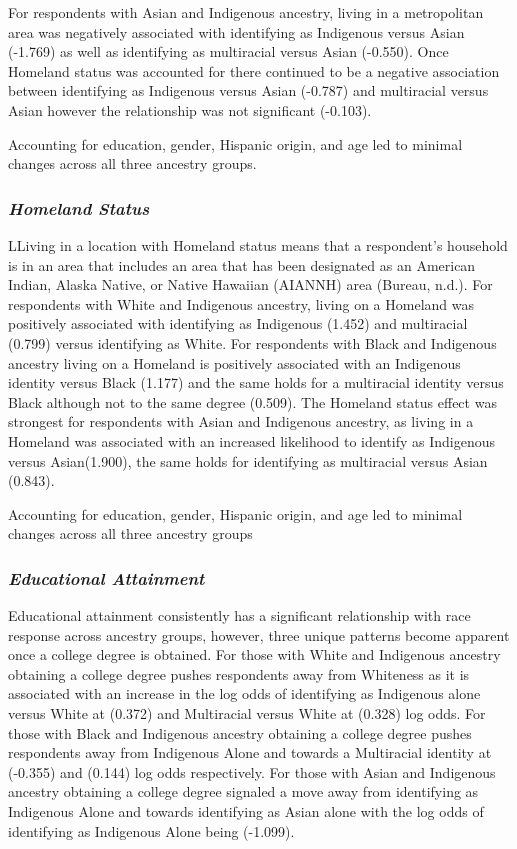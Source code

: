 \documentclass[
  12pt,
  letterpaper,
]{article}
\begin{document}
For respondents with Asian and Indigenous ancestry, living in a
metropolitan area was negatively associated with identifying as
Indigenous versus Asian (-1.769) as well as identifying as multiracial
versus Asian (-0.550). Once Homeland status was accounted for there
continued to be a negative association between identifying as Indigenous
versus Asian (-0.787) and multiracial versus Asian however the
relationship was not significant (-0.103).

Accounting for education, gender, Hispanic origin, and age led to
minimal changes across all three ancestry groups.

\subsubsection{\texorpdfstring{\emph{Homeland
Status}}{Homeland Status}}\label{homeland-status}

LLiving in a location with Homeland status means that a respondent's
household is in an area that includes an area that has been designated
as an American Indian, Alaska Native, or Native Hawaiian (AIANNH) area
(Bureau, n.d.). For respondents with White and Indigenous ancestry,
living on a Homeland was positively associated with identifying as
Indigenous (1.452) and multiracial (0.799) versus identifying as White.
For respondents with Black and Indigenous ancestry living on a Homeland
is positively associated with an Indigenous identity versus Black
(1.177) and the same holds for a multiracial identity versus Black
although not to the same degree (0.509). The Homeland status effect was
strongest for respondents with Asian and Indigenous ancestry, as living
in a Homeland was associated with an increased likelihood to identify as
Indigenous versus Asian(1.900), the same holds for identifying as
multiracial versus Asian (0.843).~

Accounting for education, gender, Hispanic origin, and age led to
minimal changes across all three ancestry groups

\subsubsection{\texorpdfstring{\emph{Educational
Attainment}}{Educational Attainment}}\label{educational-attainment}

Educational attainment consistently has a significant relationship with
race response across ancestry groups, however, three unique patterns
become apparent once a college degree is obtained. For those with White
and Indigenous ancestry obtaining a college degree pushes respondents
away from Whiteness as it is associated with an increase in the log odds
of identifying as Indigenous alone versus White at (0.372) and
Multiracial versus White at (0.328) log odds. For those with Black and
Indigenous ancestry obtaining a college degree pushes respondents away
from Indigenous Alone and towards a Multiracial identity at (-0.355) and
(0.144) log odds respectively. For those with Asian and Indigenous
ancestry obtaining a college degree signaled a move away from
identifying as Indigenous Alone and towards identifying as Asian alone
with the log odds of identifying as Indigenous Alone being (-1.099).
\end{document}
